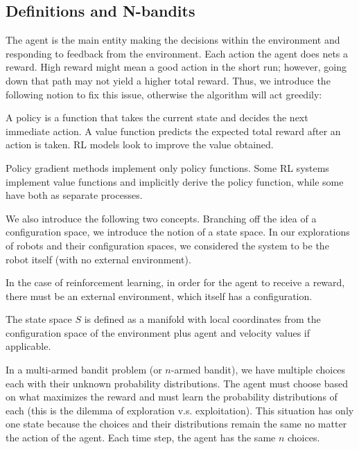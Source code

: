 \documentclass[Robotics.tex]{subfiles}
\begin{document}
\subsection{Definitions and N-bandits}
The agent is the main entity making the decisions within the environment and responding
to feedback from the environment. Each action the agent does nets a reward. High reward might
mean a good action in the short run; however, going down that path may not yield a higher total reward.
Thus, we introduce the following notion to fix this issue, otherwise the algorithm will act greedily:

\begin{defn}
A policy is a function that takes the current state and decides the next immediate action. A value function predicts
the expected total reward after an action is taken. RL models look to improve the value obtained.

Policy gradient methods implement only policy functions. Some RL systems implement value functions and implicitly derive the
policy function, while some have both as separate processes.
\end{defn}

We also introduce the following two concepts. Branching off the idea of a configuration space, we introduce the notion of a state space.
In our explorations of robots and their configuration spaces, we considered the system to be the robot itself (with no external environment).

In the case of reinforcement learning, in order for the agent to receive a reward, there must be an external environment, which itself has a configuration.
\begin{defn}
The state space $S$ is defined as a manifold with local coordinates from the configuration space of the environment plus agent and velocity values if applicable.
\end{defn}
In a multi-armed bandit problem (or $n$-armed bandit), we have multiple choices each with their unknown probability distributions. The agent must choose based on what
maximizes the reward and must learn the probability distributions of each (this is the dilemma of exploration v.s. exploitation). This situation has only one state
because the choices and their distributions remain the same no matter the action of the agent. Each time step, the agent has the same $n$ choices.
\end{document}
